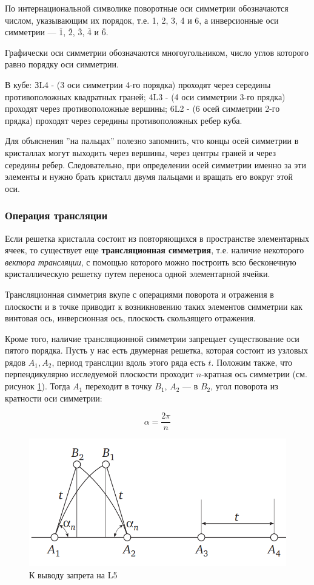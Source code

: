 \documentclass[a4paper, 12pt]{article}
\begin{document}
По интернациональной символике поворотные оси симметрии обозначаются числом, указывающим их порядок, т.е. 1, 2, 3, 4 и 6, а инверсионные оси симметрии --- $\bar{1}$, $\bar{2}$, $\bar{3}$, $\bar{4}$ и $\bar{6}$.

Графически оси симметрии обозначаются многоугольником, число углов которого равно порядку оси симметрии.

В кубе: ЗL4 - (3 оси симметрии 4-го порядка) проходят через середины противоположных квадратных граней; 4L3 - (4 оси симметрии 3-го прядка) проходят через противоположные вершины; 6L2 - (6 осей симметрии 2-го прядка) проходят через середины противоположных ребер куба.

Для объяснения ''на пальцах'' полезно запомнить, что концы осей симметрии в кристаллах могут выходить через вершины, через центры граней и через середины ребер. Следовательно, при определении осей симметрии именно за эти элементы и нужно брать кристалл двумя пальцами и вращать его вокруг этой оси.

\subsubsection*{Операция трансляции}

Если решетка кристалла состоит из повторяющихся в пространстве элементарных ячеек, то существует еще \textbf{трансляционная симметрия}, т.е. наличие некоторого \textit{вектора трансляции}, с помощью которого можно построить всю бесконечную кристаллическую решетку путем переноса одной элементарной ячейки.

Трансляционная симметрия вкупе с операциями поворота и отражения в плоскости и в точке приводит к возникновению таких элементов симметрии как винтовая ось, инверсионная ось, плоскость скользящего отражения.

Кроме того, наличие трансляционной симметрии запрещает существование оси пятого порядка. Пусть у нас есть двумерная решетка, которая состоит из узловых рядов $A_1, A_2$, период транслции вдоль этого ряда есть $t$. Положим также, что перпендикулярно исследуемой плоскости проходит $n$-кратная ось симметрии (см. рисунок \ref{fig:nol5}). Тогда $A_1$ переходит в точку $B_1$, $A_2$ --- в $B_2$, угол поворота из кратности оси симметрии:

\begin{equation}
	\alpha = \frac{2\pi}{n}
\end{equation}

\begin{figure}[H]
	\centering
	\includegraphics[width=0.7\linewidth]{nol5}
	\caption{К выводу запрета на L5}
	\label{fig:nol5}
\end{figure}
\end{document}
